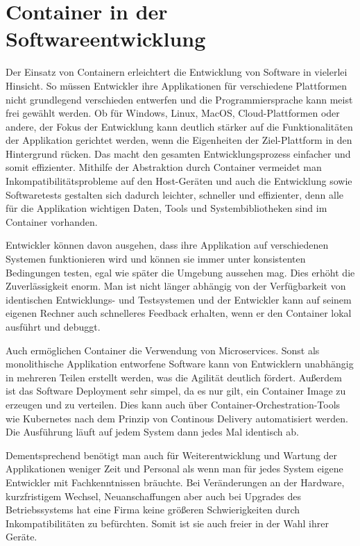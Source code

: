 \section{Container in der Softwareentwicklung} 
\label{sec:Softwareentwicklung}

Der Einsatz von Containern erleichtert die Entwicklung von Software in vielerlei Hinsicht. So müssen Entwickler ihre Applikationen für verschiedene Plattformen nicht grundlegend verschieden entwerfen und die Programmiersprache kann meist frei gewählt werden. 
Ob für Windows, Linux, MacOS, Cloud-Plattformen oder andere, der Fokus der Entwicklung kann deutlich stärker auf die Funktionalitäten der Applikation gerichtet werden, wenn die Eigenheiten der Ziel-Plattform in den Hintergrund rücken. Das macht den gesamten Entwicklungsprozess einfacher und somit effizienter.
Mithilfe der Abstraktion durch Container vermeidet man Inkompatibilitätsprobleme auf den Host-Geräten und auch die Entwicklung sowie Softwaretests gestalten sich dadurch leichter, schneller und effizienter, denn alle für die Applikation wichtigen Daten, Tools und Systembibliotheken sind im Container vorhanden.
\citep{11517836120160501}

Entwickler können davon ausgehen, dass ihre Applikation auf verschiedenen Systemen funktionieren wird und können sie immer unter konsistenten Bedingungen testen, egal wie später die Umgebung aussehen mag. Dies erhöht die Zuverlässigkeit enorm. Man ist nicht länger abhängig von der Verfügbarkeit von identischen Entwicklungs- und Testsystemen und der Entwickler kann auf seinem eigenen Rechner auch schnelleres Feedback erhalten, wenn er den Container lokal ausführt und debuggt.

Auch ermöglichen Container die Verwendung von Microservices. Sonst als monolithische Applikation entworfene Software kann von Entwicklern unabhängig in mehreren Teilen erstellt werden, was die Agilität deutlich fördert.
Außerdem ist das Software Deployment sehr simpel, da es nur gilt, ein Container Image zu erzeugen und zu verteilen. Dies kann auch über Container-Orchestration-Tools wie Kubernetes nach dem Prinzip von Continous Delivery automatisiert werden. Die Ausführung läuft auf jedem System dann jedes Mal identisch ab.
\citep{ItAgil}

Dementsprechend benötigt man auch für Weiterentwicklung und Wartung der Applikationen weniger Zeit und Personal als wenn man für jedes System eigene Entwickler mit Fachkenntnissen bräuchte.
Bei Veränderungen an der Hardware, kurzfristigem Wechsel, Neuanschaffungen aber auch bei Upgrades des Betriebssystems hat eine Firma keine größeren Schwierigkeiten durch Inkompatibilitäten zu befürchten. Somit ist sie auch freier in der Wahl ihrer Geräte.

